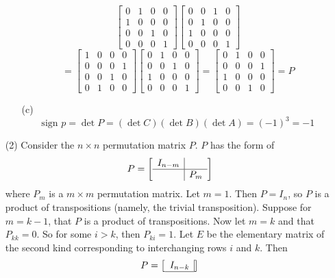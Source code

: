 \documentclass[12pt]{article}
\begin{document}
\begin{itemize}
\begin{itemize}
$$\begin{bmatrix}
0 & 1 & 0 & 0 \\
1 & 0 & 0 & 0 \\
0 & 0 & 1 & 0 \\
0 & 0 & 0 & 1
\end{bmatrix}\begin{bmatrix}
0 & 0 & 1 & 0 \\
0 & 1 & 0 & 0 \\
1 & 0 & 0 & 0 \\
0 & 0 & 0 & 1
\end{bmatrix}$$
$$= \begin{bmatrix}
1 & 0 & 0 & 0 \\
0 & 0 & 0 & 1 \\
0 & 0 & 1 & 0 \\
0 & 1 & 0 & 0
\end{bmatrix}\begin{bmatrix}
0 & 1 & 0 & 0 \\
0 & 0 & 1 & 0 \\
1 & 0 & 0 & 0 \\
0 & 0 & 0 & 1
\end{bmatrix} = \begin{bmatrix}
0 & 1 & 0 & 0 \\
0 & 0 & 0 & 1 \\
1 & 0 & 0 & 0 \\
0 & 0 & 1 & 0
\end{bmatrix} = P$$
\item[(c)]
$$\text{sign } p = \det P = (\det C)(\det B)(\det A) = (-1)^3 = -1$$
\end{itemize}
\item[(2)]
Consider the $n \times n$ permutation matrix $P$. $P$ has the form of
$$P = \begin{bmatrix}
\begin{array}{c|c}
I_{n-m} \\
\hline
& P_m
\end{array}
\end{bmatrix}$$
where $P_m$ is a $m \times m$ permutation matrix. Let $m = 1$. Then $P = I_n$, so $P$ is a product of transpositions (namely, the trivial transposition). Suppose for $m = k - 1$, that $P$ is a product of transpositions. Now let $m = k$ and that $P_{kk} = 0$. So for some $i > k$, then $P_{ki} = 1$. Let $E$ be the elementary matrix of the second kind corresponding to interchanging rows $i$ and $k$. Then
$$P = \begin{bmatrix}
\begin{array}{c|c}
I_{n-k} \\
\hline

\end{array}
\end{bmatrix}$$
\end{itemize}
\end{document}
